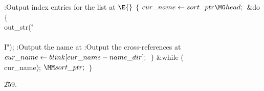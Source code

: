 \B{}:Output index entries for the list at \X${}%
\E{}$\6
${}\{{}$\1\6
${}\\{cur\_name}\K\\{sort\_ptr}\MG\\{head};{}$\6
\&{do}\5
${}\{{}$\1\6
\\{out\_str}(\.{"\\\\I"});\6
:Output the name at \X\6
:Output the cross-references at \X\6
${}\\{cur\_name}\leftarrow\\{blink}[\\{cur\_name}-\\{name\_dir}];{}$\6
\4${}\}{}$\2\5
\&{while} (\\{cur\_name});\6
${}\MM\\{sort\_ptr};{}$\6
\4${}\}{}$\2\par
\U259.\fi

